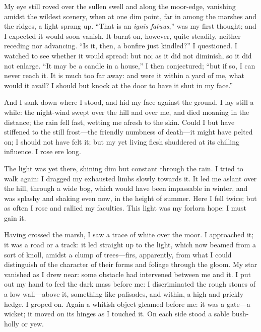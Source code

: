 My eye still roved over the sullen swell and along the moor-edge,
vanishing amidst the wildest scenery, when at one dim point, far in
among the marshes and the ridges, a light sprang up. \enquote{That is an
\emph{ignis fatuus},} was my first thought; and I expected it would
soon vanish. It burnt on, however, quite steadily, neither receding nor
advancing. \enquote{Is it, then, a bonfire just kindled?} I
questioned. I watched to see whether it would spread: but no; as it did
not diminish, so it did not enlarge. \enquote{It may be a candle in a
house,} I then conjectured; \enquote{but if so, I can never reach it. 
It is much too far away: and were it within a yard of me, what would it
avail? I should but knock at the door to have it shut in my face.}

And I sank down where I stood, and hid my face against the ground. I
lay still a while: the night-wind swept over the hill and over me, and
died moaning in the distance; the rain fell fast, wetting me afresh to
the skin. Could I but have stiffened to the still frost---the friendly
numbness of death---it might have pelted on; I should not have felt it;
but my yet living flesh shuddered at its chilling influence. I rose ere
long.

The light was yet there, shining dim but constant through the rain. I
tried to walk again: I dragged my exhausted limbs slowly towards it. It
led me aslant over the hill, through a wide bog, which would have been
impassable in winter, and was splashy and shaking even now, in the
height of summer. Here I fell twice; but as often I rose and rallied my
faculties. This light was my forlorn hope: I must gain it.

Having crossed the marsh, I saw a trace of white over the moor. I
approached it; it was a road or a track: it led straight up to the
light, which now beamed from a sort of knoll, amidst a clump of
trees---firs, apparently, from what I could distinguish of the character
of their forms and foliage through the gloom. My star vanished as I
drew near: some obstacle had intervened between me and it. I put out my
hand to feel the dark mass before me: I discriminated the rough stones
of a low wall---above it, something like palisades, and within, a high
and prickly hedge. I groped on. Again a whitish object gleamed before
me: it was a gate---a wicket; it moved on its hinges as I touched it. 
On each side stood a sable bush-holly or yew.

